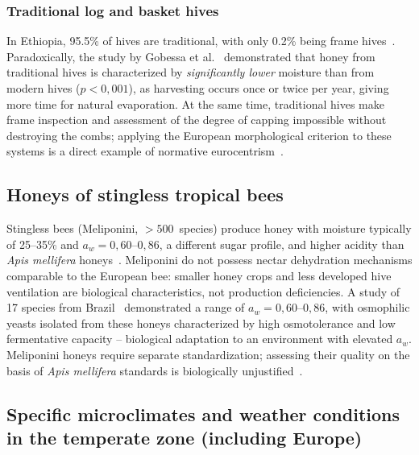 \subsubsection{Traditional log and basket hives}

In Ethiopia, 95.5\% of hives are traditional, with only 0.2\%
being frame hives~\cite{ethaau2007}. Paradoxically, the study
by Gobessa et al.~\cite{sciendo2012} demonstrated that honey
from traditional hives is characterized by \emph{significantly
lower} moisture than from modern hives ($p < 0{,}001$), as
harvesting occurs once or twice per year, giving more time
for natural evaporation. At the same time, traditional hives
make frame inspection and assessment of the degree of capping
impossible without destroying the combs; applying the European
morphological criterion to these systems is a direct example
of normative eurocentrism~\cite{tadele2025}.

\subsection{Honeys of stingless tropical bees}

Stingless bees (Meliponini, $>500$~species) produce honey with
moisture typically of 25--35\% and $a_w = 0{,}60$--$0{,}86$,
a different sugar profile, and higher acidity than
\textit{Apis mellifera} honeys~\cite{stinglessyeastbrazil2021,stinglesswjava2024}.
Meliponini do not possess nectar dehydration mechanisms
comparable to the European bee: smaller honey crops and less
developed hive ventilation are biological characteristics,
not production deficiencies. A study of 17 species
from Brazil~\cite{stinglessyeastbrazil2021} demonstrated a range
of $a_w = 0{,}60$--$0{,}86$, with osmophilic yeasts isolated
from these honeys characterized by high osmotolerance and low
fermentative capacity -- biological adaptation to an environment
with elevated $a_w$. Meliponini honeys require separate
standardization; assessing their quality on the basis of
\textit{Apis mellifera} standards is biologically
unjustified~\cite{stinglessyeastbrazil2021,stinglesswjava2024}.

\subsection{Specific microclimates and weather conditions in the temperate zone (including Europe)}

